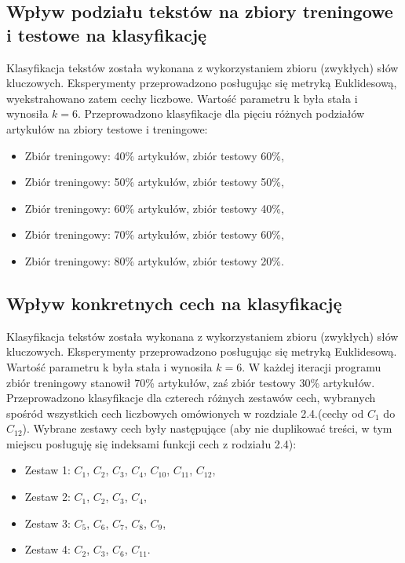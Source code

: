 \documentclass{classrep}
\begin{document}
\subsection{Wpływ podziału tekstów na zbiory treningowe i testowe na klasyfikację}
Klasyfikacja tekstów została wykonana z wykorzystaniem zbioru (zwykłych) słów kluczowych. Eksperymenty przeprowadzono posługując się metryką Euklidesową, wyekstrahowano zatem cechy liczbowe. Wartość parametru k była stała i wynosiła $k=6$. Przeprowadzono klasyfikacje dla pięciu różnych podziałów artykułów na zbiory testowe i treningowe: 
\begin{itemize}[label=$\bullet$\scshape\bfseries]

\item Zbiór treningowy: 40\% artykułów, zbiór testowy 60\%,
\item Zbiór treningowy: 50\% artykułów, zbiór testowy 50\%,
\item Zbiór treningowy: 60\% artykułów, zbiór testowy 40\%,
\item Zbiór treningowy: 70\% artykułów, zbiór testowy 60\%,
\item Zbiór treningowy: 80\% artykułów, zbiór testowy 20\%.

\end{itemize}

\subsection{Wpływ konkretnych cech na klasyfikację}
Klasyfikacja tekstów została wykonana z wykorzystaniem zbioru (zwykłych) słów kluczowych. Eksperymenty przeprowadzono posługując się metryką Euklidesową. Wartość parametru k była stała i wynosiła $k=6$. W każdej iteracji programu zbiór treningowy stanowił 70\% artykułów, zaś zbiór testowy 30\% artykułów. Przeprowadzono klasyfikacje dla czterech różnych zestawów cech, wybranych spośród wszystkich cech liczbowych omówionych w rozdziale 2.4.(cechy od $C_1$ do $C_{12}$). Wybrane zestawy cech były następujące (aby nie duplikować treści, w tym miejscu posługuję się indeksami funkcji cech z rodziału 2.4):
\begin{itemize}[label=$\bullet$\scshape\bfseries]

\item Zestaw 1: $C_{1}$,  $C_{2}$,  $C_{3}$,  $C_{4}$,  $C_{10}$,  $C_{11}$,  $C_{12}$,
\item Zestaw 2: $C_{1}$,  $C_{2}$,  $C_{3}$,  $C_{4}$,
\item Zestaw 3: $C_{5}$,  $C_{6}$,  $C_{7}$,  $C_{8}$,  $C_{9}$,
\item Zestaw 4: $C_{2}$,  $C_{3}$,  $C_{6}$,  $C_{11}$.
\end{itemize}
\end{document}
